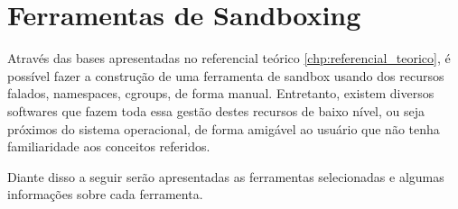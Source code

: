 \chapter{Ferramentas de Sandboxing}
\label{charpter:Ferramentas de Sandboxing}

Através das bases apresentadas no referencial teórico \ref{chp:referencial_teorico}, é possível fazer a construção de uma ferramenta de sandbox usando dos recursos falados, namespaces, cgroups, de forma manual. Entretanto, existem diversos softwares que fazem toda essa gestão destes recursos de baixo nível, ou seja próximos do sistema operacional, de forma amigável ao usuário que não tenha familiaridade aos conceitos referidos.

Diante disso a seguir serão apresentadas as ferramentas selecionadas e algumas informações sobre cada ferramenta. 










 
